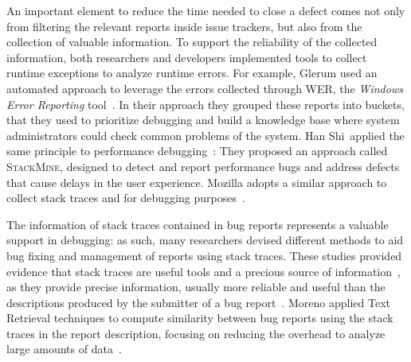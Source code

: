 


An important element to reduce the time needed to close a defect comes not only from filtering the relevant reports inside issue trackers, but also from the collection of valuable information.
To support the reliability of the collected information, both researchers and developers implemented tools to collect runtime exceptions to analyze runtime errors. For example, Glerum \etal used an automated approach to leverage the errors collected through WER, the \emph{Windows Error Reporting} tool~\cite{Glerum2009}. In their approach they grouped these reports into buckets, that they used to prioritize debugging and build a knowledge base where system administrators could check common problems of the system. Han Shi~\etal applied the same principle to performance debugging~\cite{Han2012}: They proposed an approach called \textsc{StackMine}, designed to detect and report performance bugs and address defects that cause delays in the user experience. Mozilla adopts a similar approach to collect stack traces and for debugging purposes~\cite{McLa2004}.

The information of stack traces contained in bug reports represents a valuable support in debugging: as such, many researchers devised different methods to aid bug fixing and management of reports using stack traces. These studies provided evidence that stack traces are useful tools and a precious source of information~\cite{Davie2013,Wang2013,Brod2005,Weis2007}, as they provide precise information, usually more reliable and useful than the descriptions produced by the submitter of a bug report~\cite{Ko2006}. Moreno \etal applied Text Retrieval techniques to compute similarity between bug reports using the stack traces in the report description, focusing on reducing the overhead to analyze large amounts of data~\cite{Moreno2014}.




